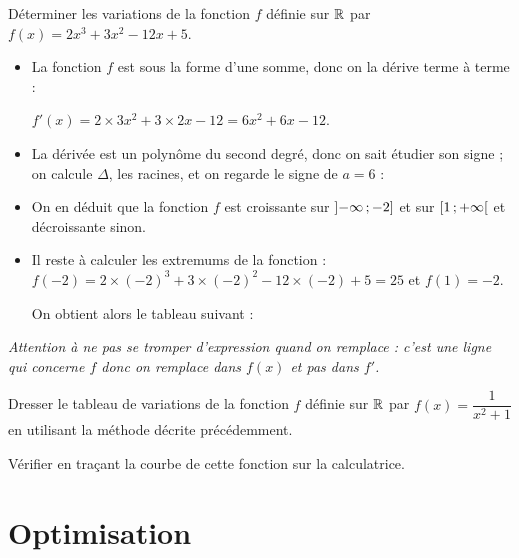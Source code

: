\documentclass[a4paper,11pt]{article}
\begin{document}
\begin{cexemple}
Déterminer les variations de la fonction $f$ définie sur $\R$ par $f(x)=2x^3+3x^2-12x+5$.
\begin{itemize}
	\item La fonction $f$ est sous la forme d'une somme, donc on la dérive terme à terme :
	
	$f'(x)=2 \times 3x^2 + 3 \times 2x -12=6x^2+6x-12$.
	\item La dérivée est un polynôme du second degré, donc on sait étudier son signe ; on calcule $ \Delta$, les racines, et on regarde le signe de $a=6$ :
	\begin{center}
	\end{center}
	\item On en déduit que la fonction $f$ est croissante sur $\mbox{\ensuremath{\left]-\infty\mathpunct{};-2\right]}}$ et sur $\mbox{\ensuremath{\left[1\mathpunct{};+\infty\right[}}$ et décroissante sinon.
	\item Il reste à calculer les extremums de la fonction : $f(-2)=2 \times (-2)^3 + 3 \times (-2)^2 - 12 \times (-2)+5=25$ et $f(1)=-2$. 
	
	On obtient alors le tableau suivant :
	\begin{center}
	\end{center}		
\end{itemize}
\textit{Attention à ne pas se tromper d'expression quand on remplace : c'est une ligne qui concerne $f$ donc on remplace dans $f(x)$ et pas dans $f'$.}
\end{cexemple}

\begin{cexercice}
Dresser le tableau de variations de la fonction $f$ définie sur $\R$ par $f(x)=\dfrac{1}{x^2+1}$ en utilisant la méthode décrite précédemment.

Vérifier en traçant la courbe de cette fonction sur la calculatrice.
\end{cexercice}

\section{Optimisation}
\end{document}
